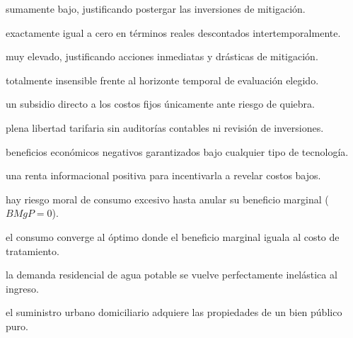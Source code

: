 \begin{opts}
    \item sumamente bajo, justificando postergar las inversiones de mitigación.
    \item exactamente igual a cero en términos reales descontados intertemporalmente.
    \item muy elevado, justificando acciones inmediatas y drásticas de mitigación.
    \item totalmente insensible frente al horizonte temporal de evaluación elegido.
\end{opts}

\begin{opts}
    \item un subsidio directo a los costos fijos únicamente ante riesgo de quiebra.
    \item plena libertad tarifaria sin auditorías contables ni revisión de inversiones.
    \item beneficios económicos negativos garantizados bajo cualquier tipo de tecnología.
    \item una renta informacional positiva para incentivarla a revelar costos bajos.
\end{opts}

\begin{opts}
    \item hay riesgo moral de consumo excesivo hasta anular su beneficio marginal ($BMgP = 0$).
    \item el consumo converge al óptimo donde el beneficio marginal iguala al costo de tratamiento.
    \item la demanda residencial de agua potable se vuelve perfectamente inelástica al ingreso.
    \item el suministro urbano domiciliario adquiere las propiedades de un bien público puro.
\end{opts}

